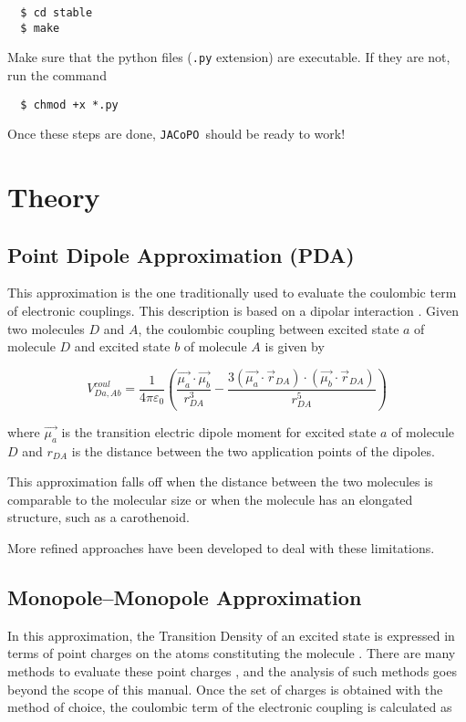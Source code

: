 \documentclass[a4paper]{article}
\newcommand{\jacopo}{\texttt{JACoPO}}
\begin{document}
\begin{verbatim}
  $ cd stable
  $ make 
\end{verbatim}

Make sure that the python files (\verb|.py| extension) are executable. If they are not, run the command

\begin{verbatim}
  $ chmod +x *.py
\end{verbatim}

Once these steps are done, \jacopo\ should be ready to work!

\section*{Theory}
\subsection*{Point Dipole Approximation (PDA)}
This approximation is the one traditionally used to evaluate the coulombic term of electronic couplings. This description is based on a dipolar interaction \cite{PDA}.  Given two molecules $D$ and $A$, the coulombic coupling between excited state $a$ of molecule $D$ and excited state $b$ of molecule $A$ is given by

\begin{equation}
 V^{coul}_{Da,Ab} = \frac{1}{4\pi\varepsilon_0} \left( \frac{\vec{\mu_a}\cdot\vec{\mu_b}}{r_{DA}^3} - \frac{3(\vec{\mu_a}\cdot \vec{r}_{DA})\cdot(\vec{\mu_b}\cdot\vec{r}_{DA})}{r_{DA}^5} \right)
 \label{eq:PDA}
\end{equation}

where $\vec{\mu_a}$ is the transition electric dipole moment for excited state $a$ of molecule $D$ and $r_{DA}$ is the distance between the two application points of the dipoles.

This approximation falls off when the distance between the two molecules is comparable to the molecular size or when the molecule has an elongated structure, such as a carothenoid.

More refined approaches have been developed to deal with these limitations.

\subsection*{Monopole--Monopole Approximation}
In this approximation, the Transition Density of an excited state is expressed in terms of point charges on the atoms constituting the molecule \cite{Woody1968}. There are many methods to evaluate these point charges \cite{Madjet2006}, and the analysis of such methods goes beyond the scope of this manual. Once the set of charges is obtained with the method of choice, the coulombic term of the electronic coupling is calculated as
\end{document}
